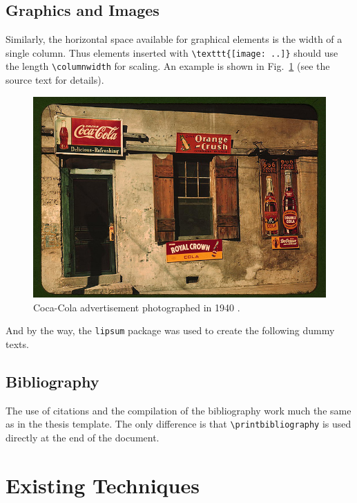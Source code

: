 \documentclass[english,smartquotes]{hgbarticle}
\begin{document}
\subsection{Graphics and Images}

Similarly, the horizontal space available for graphical elements is the width
of a single column. Thus elements inserted with \verb!\texttt{[image: ..]}! 
should use the length \verb!\columnwidth! for scaling. An example is shown in
Fig.~\ref{fig:CocaCola} (see the source text for details).

\begin{figure}
	\centering
	\includegraphics[width=1.0\columnwidth]{cola-public-domain-photo-p}
	\caption{Coca-Cola advertisement photographed in 1940 \cite{CocaCola1940}.}
	\label{fig:CocaCola}
\end{figure}

And by the way, the \texttt{lipsum} package was used to create the following
dummy texts. 

\subsection{Bibliography}

The use of citations and the compilation of the bibliography work much the
same as in the thesis template. The only difference is that
\verb!\printbibliography! is used directly at the end of the document.


\section{Existing Techniques}
\end{document}
